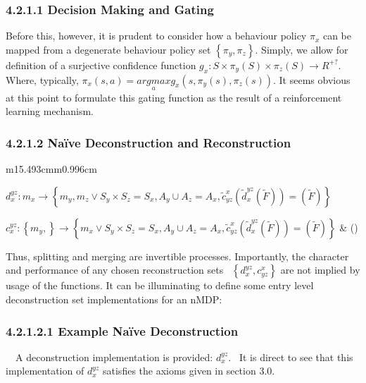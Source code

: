 \documentclass{article}
\makeatletter
\newcommand\arraybslash{\let\\\@arraycr}
\newcounter{Equation}
\renewcommand\theEquation{\arabic{Equation}}
\makeatother
\begin{document}
\subsubsection{4.2.1.1 Decision Making and Gating}

\bigskip

Before this, however, it is prudent to consider how a behaviour policy  $\pi _x$ can be mapped from a degenerate behaviour policy set  $\left\{\pi _y,\pi _z\right\}$. Simply, we allow for definition of a surjective confidence function  $g_x:S\times \pi _y(S)\times \pi _z(S)\rightarrow R^{+?}$. Where, typically,  $\pi _x\left(s,a\right)=\underset a{\mathit{argmax}}g_x\left(s,\pi _y\left(s\right),\pi _z(s)\right)$. It seems obvious at this point to formulate this gating function as the result of a reinforcement learning mechanism.

\subsubsection{4.2.1.2 Na\"ive Deconstruction and Reconstruction}
\begin{flushleft}
\tablefirsthead{}
\tablehead{}
\tabletail{}
\tablelasttail{}
\begin{supertabular}{m{15.493cm}m{0.996cm}}
{\centering  $d_x^{\mathit{yz}}:m_x\rightarrow \left\{m_y,m_z\vee S_y\times S_z=S_x,A_y{\cup}A_z=A_x,\widetilde c_{\mathit{yz}}^x\left(\widetilde d_x^{\mathit{yz}}\left(\widetilde F\right)\right)=\left(\widetilde F\right)\right\}$\par}

\centering  $c_x^{\mathit{yz}}:\left\{m_y,\right\}\rightarrow \left\{m_x\vee S_y\times S_z=S_x,A_y{\cup}A_z=A_x,\widetilde c_{\mathit{yz}}^x\left(\widetilde d_x^{\mathit{yz}}\left(\widetilde F\right)\right)=\left(\widetilde F\right)\right\}$ &
\centering\arraybslash (\stepcounter{Equation}{\theEquation})\\
\end{supertabular}
\end{flushleft}
Thus, splitting and merging are invertible processes. Importantly, the character and performance of any chosen reconstruction sets \  $\left\{d_x^{\mathit{yz}},c_{\mathit{yz}}^x\right\}$ are not implied by usage of the functions. It can be illuminating to define some entry level deconstruction set implementations for an nMDP:

\subsubsection{4.2.1.2.1 Example Na\"ive Deconstruction}
\ \ A deconstruction implementation is provided:  $d_x^{\mathit{yz}}$. \ It is direct to see that this implementation of  $d_x^{\mathit{yz}}$ satisfies the axioms given in section 3.0.
\end{document}
